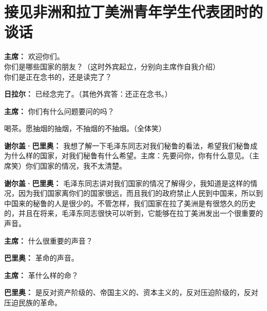 \section[接见非洲和拉丁美洲青年学生代表团时的谈话（一九六四年八月二十五日）]{接见非洲和拉丁美洲青年学生代表团时的谈话}


\begin{list}{}{
    \setlength{\topsep}{0pt}        %
    \setlength{\partopsep}{0pt}     %
    \setlength{\parsep}{\parskip}   %
    \setlength{\itemsep}{\lineskip}       %
    \setlength{\labelsep}{0pt}%
    \setlength{\labelwidth}{3em}%
    \setlength{\itemindent}{0pt}%
    \setlength\listparindent{\parindent}
    \setlength{\leftmargin}{3em}
    \setlength{\rightmargin}{0pt}
    }
\item[\textbf{主席：}] 欢迎你们。\\
你们是哪些国家的朋友？（这时外宾起立，分别向主席作自我介绍）\\
你们是正在念书的，还是读完了？

\item[\textbf{日拉尔：}] 已经念完了。（其他外宾答：还正在念书。）

\item[\textbf{主席：}] 你们有什么问题要问的吗？

喝茶。愿抽烟的抽烟，不抽烟的不抽烟。（全体笑）

\item[\textbf{谢尔盖·巴里奥：}] 我想了解一下毛泽东同志对我们秘鲁的看法，希望我们秘鲁成为什么样的国家，对我们秘鲁有什么希望。主席：先要问你，你有什么意见。（主席笑）你们国家的情况，我不太清楚。

\item[\textbf{谢尔盖·巴里奥：}] 毛泽东同志讲对我们国家的情况了解得少，我知道是这样的情况，因为我们国家离你们的国家很远，而且我们的政府禁止人民到中国来，所以到中国来的秘鲁的人是很少的。不管怎样，我们国家在拉了美洲是有很悠久的历史的，并且在将来，毛泽东同志很快可以听到，它能够在拉丁美洲发出一个很重要的声音。

\item[\textbf{主席：}] 什么很重要的声音？

\item[\textbf{巴里奥：}] 革命的声音。

\item[\textbf{主席：}] 革什么样的命？

\item[\textbf{巴里奥：}] 是反对资产阶级的、帝国主义的、资本主义的，反对压迫阶级的，反对压迫民族的革命。


\end{list}
